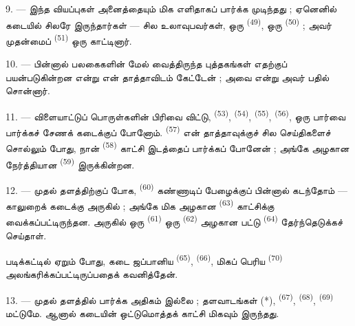 9. --- இந்த வியப்புகள் அனைத்தையும் மிக எளிதாகப் பார்க்க
முடிந்தது ; ஏனெனில் கடையில் சிலரே இருந்தார்கள் — சில
உலாவுபவர்கள், ஒரு  \textsuperscript{(49)},
ஒரு  \textsuperscript{(50)} ; அவர் முதன்மைப்
 \textsuperscript{(51)} ஒரு
 காட்டினார்.

10. ---  பின்னால் பலகைகளின் மேல் வைத்திருந்த
புத்தகங்கள் எதற்குப் பயன்படுகின்றன என்று என் தாத்தாவிடம்
கேட்டேன் ; அவை  என்று அவர் பதில்
சொன்னார்.

\VUsaut{3.6mm}
\VUsaut{2.8mm}

11. --- விளையாட்டுப் பொருள்களின் பிரிவை விட்டு, 
\textsuperscript{(53)},  \textsuperscript{(54)},
 \textsuperscript{(55)},  \textsuperscript{(56)},  ஒரு
பார்வை பார்க்கச் சேணக் கடைக்குப் போனோம். 
\textsuperscript{(57)} என் தாத்தாவுக்குச் சில செய்திகளைச் சொல்லும்
போது, நான்  
\textsuperscript{(58)} காட்சி இடத்தைப் பார்க்கப் போனேன் ; அங்கே
அழகான  நேர்த்தியான  \textsuperscript{(59)} இருக்கின்றன.

12. --- முதல் தளத்திற்குப் போக, 
\textsuperscript{(60)} கண்ணாடிப் பேழைக்குப் பின்னால் கடந்தோம் —
காலுறைக் கடைக்கு அருகில் ; அங்கே மிக அழகான 
\textsuperscript{(63)} காட்சிக்கு வைக்கப்பட்டிருந்தன. அருகில் ஒரு
 \textsuperscript{(61)} ஒரு  \textsuperscript{(62)} அழகான பட்டு  \textsuperscript{(64)} தேர்ந்தெடுக்கச் செய்தாள்.

படிக்கட்டில் ஏறும் போது, கடை ஜப்பானிய 
\textsuperscript{(65)},  \textsuperscript{(66)},
மிகப் பெரிய  \textsuperscript{(70)}
அலங்கரிக்கப்பட்டிருப்பதைக் கவனித்தேன்.

13. --- முதல் தளத்தில் பார்க்க அதிகம் இல்லை ; தளவாடங்கள் (*),
 \textsuperscript{(67)},  \textsuperscript{(68)}, 
\textsuperscript{(69)} மட்டுமே. ஆனால் கடையின் ஒட்டுமொத்தக் காட்சி
மிகவும்  இருந்தது.

